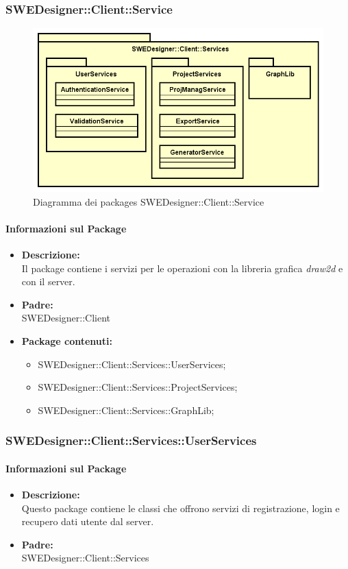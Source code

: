 \subsubsection{SWEDesigner::Client::Service}
		 \begin{figure}[h!]
		\centering
		\includegraphics[scale=0.4]{Disegnetti/SWEDesigner__Client__Services.png}
		\caption{Diagramma dei packages SWEDesigner::Client::Service}
 		\end{figure}
		\paragraph{Informazioni sul Package}
		\begin{itemize}
			\item \textbf{Descrizione: }\\
			Il package contiene i servizi per le operazioni con la libreria grafica
			\emph{draw2d} e con il server.
			\item \textbf{Padre: }\\ SWEDesigner::Client
			\item \textbf{Package contenuti: }
			\begin{itemize}
				\item SWEDesigner::Client::Services::UserServices;
				\item SWEDesigner::Client::Services::ProjectServices;
				\item SWEDesigner::Client::Services::GraphLib;
			\end{itemize}
		\end{itemize}

	\subsubsection{SWEDesigner::Client::Services::UserServices}
		\paragraph{Informazioni sul Package}
		\begin{itemize}
			\item \textbf{Descrizione: }\\
			Questo package contiene le classi che offrono servizi di registrazione, login
			e recupero dati utente dal server.
			\item \textbf{Padre: }\\ SWEDesigner::Client::Services
		\end{itemize}

